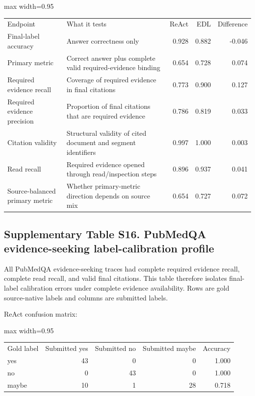 \documentclass[
  8pt,
]{extarticle}
\begin{document}
\begin{center}
\begin{adjustbox}{max width=0.95\textwidth}
\begin{tabular}{@{}
llrrr@{}}
\toprule\noalign{}
Endpoint & What it tests & ReAct & EDL & Difference \\

Final-label accuracy & Answer correctness only & 0.928 & 0.882 &
-0.046 \\
Primary metric & Correct answer plus complete valid required-evidence
binding & 0.654 & 0.728 & 0.074 \\
Required evidence recall & Coverage of required evidence in final
citations & 0.773 & 0.900 & 0.127 \\
Required evidence precision & Proportion of final citations that are
required evidence & 0.786 & 0.819 & 0.033 \\
Citation validity & Structural validity of cited document and segment
identifiers & 0.997 & 1.000 & 0.003 \\
Read recall & Required evidence opened through read/inspection steps &
0.896 & 0.937 & 0.041 \\
Source-balanced primary metric & Whether primary-metric direction
depends on source mix & 0.654 & 0.727 & 0.072 \\
\bottomrule
\end{tabular}
\end{adjustbox}
\end{center}

\hypertarget{supplementary-table-s16-pubmedqa-evidence-seeking-label-calibration-profile}{%
\subsection{Supplementary Table S16. PubMedQA evidence-seeking
label-calibration
profile}\label{supplementary-table-s16-pubmedqa-evidence-seeking-label-calibration-profile}}

All PubMedQA evidence-seeking traces had complete required evidence
recall, complete read recall, and valid final citations. This table
therefore isolates final-label calibration errors under complete
evidence availability. Rows are gold source-native labels and columns
are submitted labels.

ReAct confusion matrix:

\begin{center}
\begin{adjustbox}{max width=0.95\textwidth}
\begin{tabular}{@{}
lrrrr@{}}
\toprule\noalign{}
Gold label & Submitted yes & Submitted no & Submitted maybe &
Accuracy \\

yes & 43 & 0 & 0 & 1.000 \\
no & 0 & 43 & 0 & 1.000 \\
maybe & 10 & 1 & 28 & 0.718 \\
\bottomrule
\end{tabular}
\end{adjustbox}
\end{center}
\end{document}

